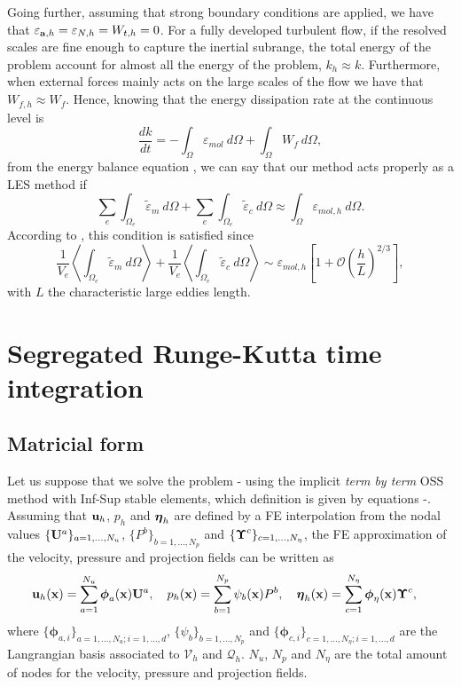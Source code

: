 Going further, assuming that strong boundary conditions are applied, we have that $ \varepsilon_{{\bf a},h}=\varepsilon_{N,h}=W_{t,h}=0 $. For a fully developed turbulent flow, if the resolved scales are fine enough to capture the inertial subrange, the total energy of the problem account for almost all the energy of the problem, $ k_h\approx k $. Furthermore, when external forces mainly acts on the large scales of the flow we have that $ W_{f,h}\approx W_f $. Hence, knowing that the energy dissipation rate at the continuous level is
$$ \frac{dk}{dt}=-\int_{\Omega}\varepsilon_{mol}\ d\Omega+\int_{\Omega}W_{f}\ d\Omega, $$
from the energy balance equation , we can say that our method acts properly as a LES method if
$$ \sum_e\int_{\Omega_e}\widetilde{\varepsilon}_m\ d\Omega+\sum_e\int_{\Omega_e}\widetilde{\varepsilon}_c\ d\Omega\approx\int_{\Omega}\varepsilon_{mol,h}\ d\Omega. $$
According to \cite{guasch_statistical_2013}, this condition is satisfied since 
$$ \frac{1}{V_e}\left\langle\int_{\Omega_e}\widetilde{\varepsilon}_m\ d\Omega\right\rangle + \frac{1}{V_e}\left\langle\int_{\Omega_e}\widetilde{\varepsilon}_c\ d\Omega\right\rangle\sim\varepsilon_{mol,h}\left[1+\mathcal{O}\left(\frac{h}{L}\right)^{2/3}\right], $$
with $ L $ the characteristic large eddies length.

\section{Segregated Runge-Kutta time integration}
\label{sec-C7_SRK}
\subsection{Matricial form}
Let us suppose that we solve the problem - using the implicit \textit{term by term} OSS method with Inf-Sup stable elements, which definition is given by equations -. Assuming that ${\bf u}_h$, $p_h$ and $\boldsymbol{\eta}_h$ are defined by a FE interpolation from the nodal values $\{{\bf U}^a\}_{a=1,...,N_u}$, $\{P^b\}_{b=1,...,N_p}$ and $\{\boldsymbol{\Upsilon}^c\}_{c=1,...,N_\eta}$, the FE approximation of the velocity, pressure and projection fields can be written as
\begin{align*}
&{\bf u}_h({\bf x})=\sum_{a=1}^{N_u}\boldsymbol{\phi}_a({\bf x}){\bf U}^a,\quad p_h({\bf x})=\sum_{b=1}^{N_p}\psi_b({\bf x})P^b,\quad \boldsymbol{\eta}_h({\bf x})=\sum_{c=1}^{N_\eta}\boldsymbol{\phi}_\eta({\bf x})\boldsymbol{\Upsilon}^c,
\end{align*}
where $\{\boldsymbol{\phi}_{a,i}\}_{a=1,...,N_u;i=1,...,d}$, $\{\psi_b\}_{b=1,...,N_p}$ and $\{\boldsymbol{\phi}_{c,i}\}_{c=1,...,N_\eta;i=1,...,d}$ are the Langrangian basis associated to $\mathcal{V}_h$ and $\mathcal{Q}_h$. $N_u$, $N_p$ and $N_\eta$ are the total amount of nodes for the velocity, pressure and projection fields. 

